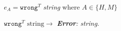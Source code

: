 \begin{case}

$e_{A}=\mathtt{wrong}^{T}$ \emph{string} where $A\in\lbrace H,M\rbrace$

$\mathtt{wrong}^{T}$ $\mathrm{string}\rightarrow$ \emph{\textbf{Error}: string}.

\end{case}